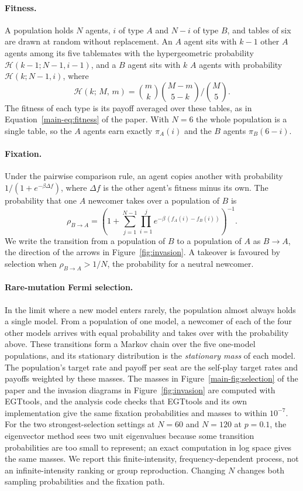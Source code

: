 \documentclass[10pt]{article}
\begin{document}
\paragraph{Fitness.} A population holds $N$ agents, $i$ of type $A$ and $N-i$ of type $B$, and tables of six are drawn at random without replacement. An $A$ agent sits with $k-1$ other $A$ agents among its five tablemates with the hypergeometric probability $\mathcal{H}(k-1;N-1,i-1)$, and a $B$ agent sits with $k$ $A$ agents with probability $\mathcal{H}(k;N-1,i)$, where
\[
\mathcal{H}(k;\,M,\,m)=\binom{m}{k}\binom{M-m}{5-k}\Big/\binom{M}{5}.
\]
The fitness of each type is its payoff averaged over these tables, as in Equation~\eqref{main-eq:fitness} of the paper. With $N=6$ the whole population is a single table, so the $A$ agents earn exactly $\pi_A(i)$ and the $B$ agents $\pi_B(6-i)$.

\paragraph{Fixation.} Under the pairwise comparison rule, an agent copies another with probability $1/(1+e^{-\beta\Delta f})$, where $\Delta f$ is the other agent's fitness minus its own. The probability that one $A$ newcomer takes over a population of $B$ is
\[
\rho_{B\to A}=\left(1+\sum_{j=1}^{N-1}\prod_{i=1}^{j}e^{-\beta\,(f_A(i)-f_B(i))}\right)^{-1}.
\]
We write the transition from a population of $B$ to a population of $A$ as $B\to A$, the direction of the arrows in Figure~\ref{fig:invasion}. A takeover is favoured by selection when $\rho_{B\to A}>1/N$, the probability for a neutral newcomer.

\paragraph{Rare-mutation Fermi selection.} In the limit where a new model enters rarely, the population almost always holds a single model. From a population of one model, a newcomer of each of the four other models arrives with equal probability and takes over with the probability above. These transitions form a Markov chain over the five one-model populations, and its stationary distribution is the \emph{stationary mass} of each model. The population's target rate and payoff per seat are the self-play target rates and payoffs weighted by these masses. The masses in Figure~\ref{main-fig:selection} of the paper and the invasion diagrams in Figure~\ref{fig:invasion} are computed with EGTtools, and the analysis code checks that EGTtools and its own implementation give the same fixation probabilities and masses to within $10^{-7}$. For the two strongest-selection settings at $N=60$ and $N=120$ at $p=0.1$, the eigenvector method sees two unit eigenvalues because some transition probabilities are too small to represent; an exact computation in log space gives the same masses. We report this finite-intensity, frequency-dependent process, not an infinite-intensity ranking or group reproduction. Changing $N$ changes both sampling probabilities and the fixation path.
\end{document}
